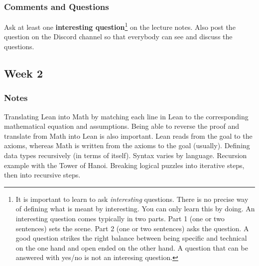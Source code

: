 \documentclass{article}
\theoremstyle{theorem}
\theoremstyle{definition}
\theoremstyle{remark}
\begin{document}
  \egroup

%
%

\subsubsection*{Comments and Questions}



Ask at least one \textbf{interesting question}\footnote{It is important to learn to ask \emph{interesting} questions. There is no precise way of defining what is meant by interesting. You can only learn this by doing. An interesting question comes typically in two parts. Part 1 (one or two sentences) sets the scene. Part 2 (one or two sentences) asks the question. A good question strikes the right balance between being specific and technical on the one hand and open ended on the other hand. A question that can be answered with yes/no is not an interesing question.} on the lecture notes. Also post the question on the Discord channel so that everybody can see and discuss the questions.

\subsection{Week 2}

\subsubsection*{Notes}
Translating Lean into Math by matching each line in Lean to the corresponding mathematical equation and assumptions. Being able to reverse the proof and translate from Math into Lean is also important. Lean reads from the goal to the axioms, whereas Math is written from the axioms to the goal (usually).
\newline \newline Defining data types recursively (in terms of itself). Syntax varies by language. 
\newline \newline Recursion example with the Tower of Hanoi. Breaking logical puzzles into iterative steps, then into recursive steps.
\end{document}
